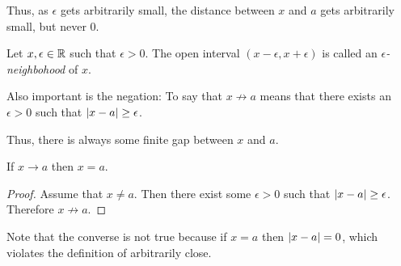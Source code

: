 \documentclass[letterpaper,12pt,fleqn]{article}
\newcommand{\e}{\epsilon}
\begin{document}
Thus, as \(\e\) gets arbitrarily small, the distance between \(x\) and \(a\) gets arbitrarily small, but never \(0\).

\begin{definition}[Neighborhood]
  Let \(x,\e\in\R\) such that \(\e>0\).  The open interval \((x-\e,x+\e)\) is called an \emph{\(\e\)-neighbohood}
  of \(x\).
\end{definition}

Also important is the negation: To say that \(x\not\to a\) means that there exists an \(\e>0\) such that
\(\abs{x-a}\ge\e\).

\bigskip

\begin{center}
\end{center}

Thus, there is always some finite gap between \(x\) and \(a\).

\begin{theorem}
  If \(x\to a\) then \(x=a\).
\end{theorem}

\begin{proof}
  Assume that \(x\ne a\).  Then there exist some \(\e>0\) such that \(\abs{x-a}\ge\e\).  Therefore \(x\not\to a\).
\end{proof}

Note that the converse is not true because if \(x=a\) then \(\lvert x-a\rvert=0\), which violates the definition of
arbitrarily close.

\newpage
\end{document}
